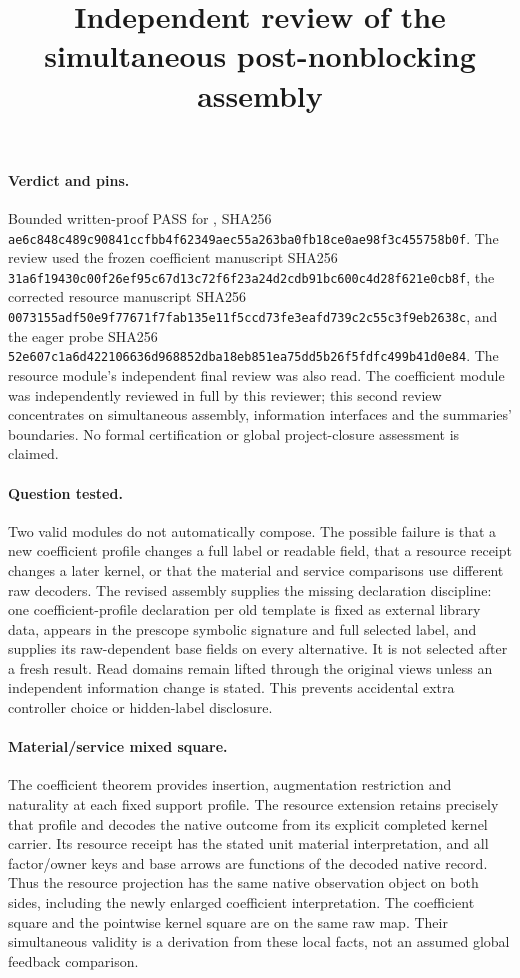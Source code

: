 \documentclass{article}
\title{Independent review of the simultaneous post-nonblocking assembly}
\author{}\date{}
\begin{document}
\maketitle
\paragraph{Verdict and pins.}
Bounded written-proof PASS for
, SHA256
\texttt{ae6c848c489c90841ccfbb4f62349aec55a263ba0fb18ce0ae98f3c455758b0f}.
The review used the frozen coefficient manuscript SHA256
\texttt{31a6f19430c00f26ef95c67d13c72f6f23a24d2cdb91bc600c4d28f621e0cb8f},
the corrected resource manuscript SHA256
\texttt{0073155adf50e9f77671f7fab135e11f5ccd73fe3eafd739c2c55c3f9eb2638c},
and the eager probe SHA256
\texttt{52e607c1a6d422106636d968852dba18eb851ea75dd5b26f5fdfc499b41d0e84}.
The resource module's independent final review was also read. The coefficient module was independently reviewed in full by this reviewer; this second review concentrates on simultaneous assembly, information interfaces and the summaries' boundaries. No formal certification or global project-closure assessment is claimed.

\paragraph{Question tested.}
Two valid modules do not automatically compose. The possible failure is that a new coefficient profile changes a full label or readable field, that a resource receipt changes a later kernel, or that the material and service comparisons use different raw decoders. The revised assembly supplies the missing declaration discipline: one coefficient-profile declaration per old template is fixed as external library data, appears in the prescope symbolic signature and full selected label, and supplies its raw-dependent base fields on every alternative. It is not selected after a fresh result. Read domains remain lifted through the original views unless an independent information change is stated. This prevents accidental extra controller choice or hidden-label disclosure.

\paragraph{Material/service mixed square.}
The coefficient theorem provides insertion, augmentation restriction and naturality at each fixed support profile. The resource extension retains precisely that profile and decodes the native outcome from its explicit completed kernel carrier. Its resource receipt has the stated unit material interpretation, and all factor/owner keys and base arrows are functions of the decoded native record. Thus the resource projection has the same native observation object on both sides, including the newly enlarged coefficient interpretation. The coefficient square and the pointwise kernel square are on the same raw map. Their simultaneous validity is a derivation from these local facts, not an assumed global feedback comparison.
\end{document}
